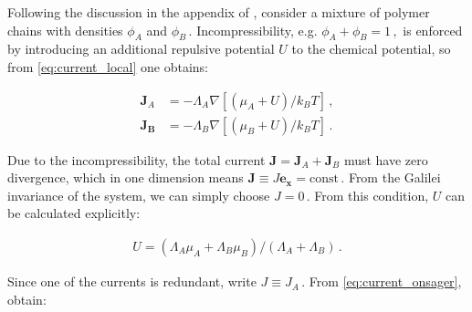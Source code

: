 \documentclass[bachelor,       %
               twoside,        %
               BCOR10mm,       %
               ngerman, english %
               ]{GAUBM}
\begin{document}








Following the discussion in the appendix of \cite{deGennes80}, consider a mixture of polymer chains with densities $\phi_A$ and $\phi_B\,.$ Incompressibility, e.g. $\phi_A+\phi_B=1\,,$ is enforced by introducing an additional repulsive potential $U$ to the chemical potential, so from \eqref{eq:current_local} one obtains:



\begin{subequations}
  \begin{align}
    \mathbf{J}_A&=-\Lambda_A\nabla [(\mu_A + U)/k_BT]\,,\\
    \mathbf{J_B}&=-\Lambda_B\nabla [(\mu_B + U)/k_BT]\,.
  \end{align}
  \label{eq:current_onsager}
\end{subequations}

Due to the incompressibility, the total current $\mathbf J=\mathbf{J}_A+\mathbf{J}_B$ must have zero divergence, which in one dimension means $\mathbf J\equiv J\mathbf{e_x}=\mathrm{const}\,.$ From the Galilei invariance of the system, we can simply choose $J=0\,.$ From this condition, $U$ can be calculated explicitly:

\begin{align}
  U=(\Lambda_A\mu_A+\Lambda_B\mu_B)/(\Lambda_A+\Lambda_B)\,.
\end{align}

Since one of the currents is redundant, write $J\equiv J_A\,.$ From \eqref{eq:current_onsager}, obtain:
\end{document}
